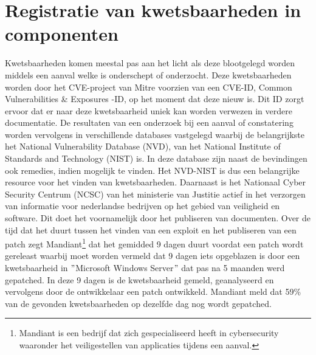 \section{Registratie van kwetsbaarheden in componenten}\label{sec:registratie-van-kwetsbaarheden-in-bibliotheken}
Kwetsbaarheden komen meestal pas aan het licht als deze blootgelegd worden middels een aanval welke is onderschept of onderzocht. Deze kwetsbaarheden worden door het CVE-project van Mitre voorzien van een CVE-ID, Common Vulnerabilities \& Exposures -ID, op het moment dat deze nieuw is. Dit ID zorgt ervoor dat er naar deze kwetsbaarheid uniek kan worden verwezen in verdere documentatie. De resultaten van een onderzoek bij een aanval of constatering worden vervolgens in verschillende databases vastgelegd waarbij de belangrijkste het National Vulnerability Database (NVD), van het National Institute of Standards and Technology (NIST) is.
In deze database zijn naast de bevindingen ook remedies, indien mogelijk te vinden. Het NVD-NIST is dus een belangrijke resource voor het vinden van kwetsbaarheden. Daarnaast is het Nationaal Cyber Security Centrum (NCSC) van het ministerie van Justitie actief in het verzorgen van informatie voor nederlandse bedrijven op het gebied van veiligheid en software. Dit doet het voornamelijk door het publiseren van documenten.
Over de tijd dat het duurt tussen het vinden van een exploit en het publiseren van een patch zegt Mandiant\footnote{Mandiant is een bedrijf dat zich gespecialiseerd heeft in cybersecurity waaronder het veiligestellen van applicaties tijdens een aanval.} dat het gemidded 9 dagen duurt voordat een patch wordt gereleast waarbij moet worden vermeld dat 9 dagen iets opgeblazen is door een kwetsbaarheid in $"$Microsoft Windows Server$"$ dat pas na 5 maanden werd gepatched. In deze 9 dagen is de kwetsbaarheid gemeld, geanalyseerd en vervolgens door de ontwikkelaar een patch ontwikkeld. Mandiant meld dat 59\% van de gevonden kwetsbaarheden op dezelfde dag nog wordt gepatched. ~\citep{mandiant:2020}

